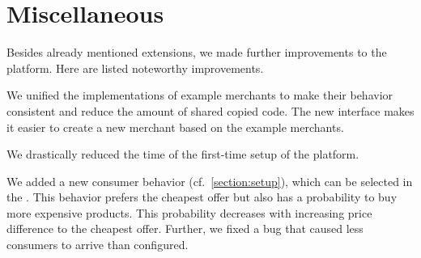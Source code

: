 \section{Miscellaneous}
Besides already mentioned extensions, we made further improvements to the \pricewars platform. Here are listed noteworthy improvements.

We unified the implementations of example merchants to make their behavior consistent and reduce the amount of shared copied code.
The new interface makes it easier to create a new merchant based on the example merchants.

We drastically reduced the time of the first-time setup of the \pricewars platform.

We added a new consumer behavior (cf.~\cref{section:setup}), which can be selected in the \ui.
This behavior prefers the cheapest offer but also has a probability to buy more expensive products.
This probability decreases with increasing price difference to the cheapest offer.
Further, we fixed a bug that caused less consumers to arrive than configured.
